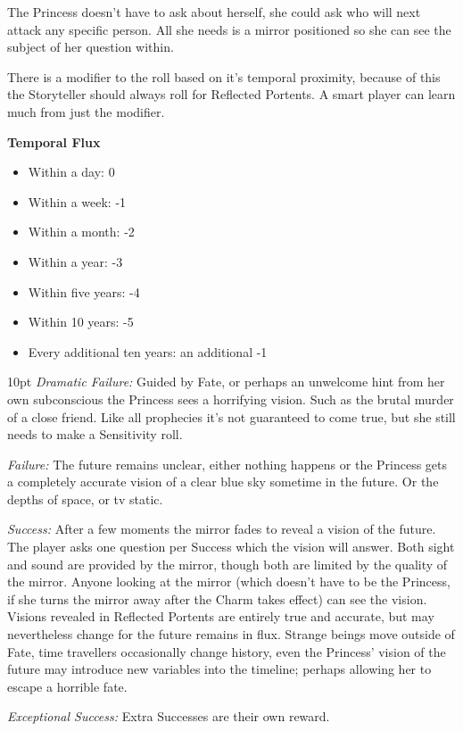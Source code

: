 The Princess doesn't have to ask about herself, she could ask who will next attack any specific person. All she needs is a mirror positioned so she can see the subject of her question within. 

There is a modifier to the roll based on it's temporal proximity, because of this the Storyteller should always roll for Reflected Portents. A smart player can learn much from just the modifier.

\begin{mybox} 

\textbf{Temporal Flux}

\begin{itemize}[label={}]

    \item Within a day: 0
    \item Within a week: -1
    \item Within a month: -2
    \item Within a year: -3
    \item Within five years: -4
    \item Within 10 years: -5
    \item Every additional ten years: an additional -1
	
	\end{itemize}
	\end{mybox}

   \begin{myindentpar}{10pt} \emph{Dramatic Failure:} Guided by Fate, or perhaps an unwelcome hint from her own subconscious the Princess sees a horrifying vision. Such as the brutal murder of a close friend. Like all prophecies it's not guaranteed to come true, but she still needs to make a Sensitivity roll.

    \emph{Failure:} The future remains unclear, either nothing happens or the Princess gets a completely accurate vision of a clear blue sky sometime in the future. Or the depths of space, or tv static.

    \emph{Success:} After a few moments the mirror fades to reveal a vision of the future. The player asks one question per Success which the vision will answer. Both sight and sound are provided by the mirror, though both are limited by the quality of the mirror. Anyone looking at the mirror (which doesn't have to be the Princess, if she turns the mirror away after the Charm takes effect) can see the vision. Visions revealed in Reflected Portents are entirely true and accurate, but may nevertheless change for the future remains in flux. Strange beings move outside of Fate, time travellers occasionally change history, even the Princess' vision of the future may introduce new variables into the timeline; perhaps allowing her to escape a horrible fate.

    \emph{Exceptional Success:} Extra Successes are their own reward.\end{myindentpar}

